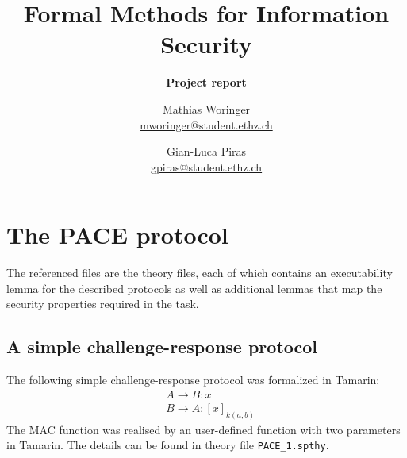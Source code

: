 \documentclass[a4paper,11pt]{scrartcl}
\title{Formal Methods for Information Security}
\author{Mathias Woringer \\ \href{mailto:mworinger@student.ethz.ch} {mworinger@student.ethz.ch}
\and Gian-Luca Piras \\ \href{mailto:gpiras@student.ethz.ch}{gpiras@student.ethz.ch}}
\subtitle{\textbf{Project report}}
\begin{document}
\maketitle

\section{The PACE protocol}
The  referenced files are the theory files, each of which contains an executability lemma for the described protocols as well as additional lemmas that map the security properties required in the task.
\subsection{A simple challenge-response protocol}
The following simple challenge-response protocol was formalized in Tamarin:
\begin{align*}
  &A \rightarrow B: x\\
  &B \rightarrow A: [x]_{k(a,b)}
\end{align*}
The MAC function was realised by an user-defined function with two parameters in Tamarin.  The details can be found in theory file \texttt{PACE\_1.spthy}.
\end{document}
